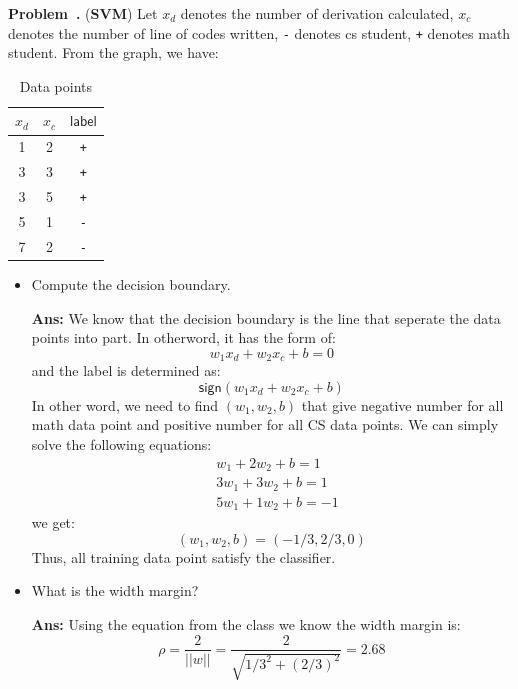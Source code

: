 \documentclass{article}
\newcounter{problem}[section]
\newenvironment{problem}[1][]{\refstepcounter{problem}\par\medskip
   \noindent \textbf{Problem~\theproblem. #1} \rmfamily}{\medskip}
\newenvironment{proof}{\begin{mdframed}\textbf{Ans:}}{ \end{mdframed}}
\begin{document}
\begin{problem}(\textbf{SVM})
Let $x_d$ denotes the number of derivation calculated,  $x_c$ denotes the number of line of codes written, \texttt{-} denotes cs student, \texttt{+} denotes math student. From the graph, we have:
\begin{table}[h!]
\centering
\begin{tabular}{c|c|c}
    $x_d$ & $x_c$ & $\mathsf{label}$\\\hline
    1 & 2 & \texttt{+}\\
    3 & 3 & \texttt{+}\\
    3 & 5 & \texttt{+}\\
    5 & 1 & \texttt{-}\\
    7 & 2 & \texttt{-}\\
\end{tabular}
\caption{Data points}
\end{table}
\begin{itemize}
    \item Compute the decision boundary. 
    \begin{proof}
        We know that the decision boundary is the line that seperate the data points into part. In otherword, it has the form of:
        \begin{equation}
            w_1x_d + w_2x_c +b =0
         \end{equation}
         and the label is determined as:
         \begin{equation}
             \mathsf{sign}(w_1x_d + w_2x_c +b)
         \end{equation}
    In other word, we need to find $(w_1,w_2,b)$ that give negative number for all math data point and positive number for all CS data points. We can simply solve the following equations:
    \begin{equation}
        \begin{split}
              &w_1 + 2w_2 + b =1
            \\&3w_1 + 3w_2 + b =1
            \\&5w_1 + 1w_2 + b =-1
        \end{split}
    \end{equation}
    we get:
    \begin{equation}
        (w_1,w_2,b) = (-1/3, 2/3, 0)
    \end{equation}
    Thus, all training data point satisfy the classifier.
    \end{proof}
    \item What is the width margin?
    \begin{proof}
        Using the equation from the class we know the width margin is:
        \begin{equation}
            \rho = \frac{2}{||w||} = \frac{2}{\sqrt{1/3^2 + (2/3)^2}} = 2.68
        \end{equation}
    \end{proof}


\end{itemize}
\end{problem}
\end{document}
